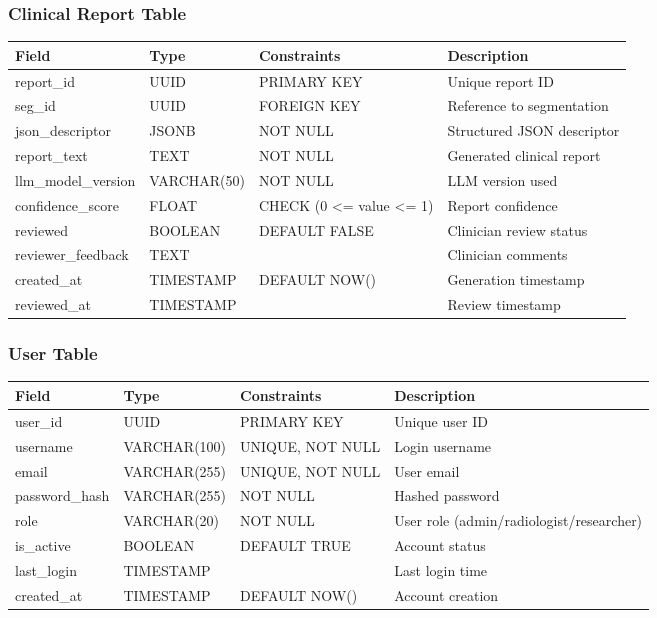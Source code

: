 \documentclass[12pt,a4paper]{article}
\begin{document}
\subsubsection{Clinical Report Table}
\begin{table}[H]
\centering
\begin{tabularx}{\textwidth}{|l|l|l|X|}
\hline
\textbf{Field} & \textbf{Type} & \textbf{Constraints} & \textbf{Description} \\
\hline
report\_id & UUID & PRIMARY KEY & Unique report ID \\
seg\_id & UUID & FOREIGN KEY & Reference to segmentation \\
json\_descriptor & JSONB & NOT NULL & Structured JSON descriptor \\
report\_text & TEXT & NOT NULL & Generated clinical report \\
llm\_model\_version & VARCHAR(50) & NOT NULL & LLM version used \\
confidence\_score & FLOAT & CHECK (0 <= value <= 1) & Report confidence \\
reviewed & BOOLEAN & DEFAULT FALSE & Clinician review status \\
reviewer\_feedback & TEXT & & Clinician comments \\
created\_at & TIMESTAMP & DEFAULT NOW() & Generation timestamp \\
reviewed\_at & TIMESTAMP & & Review timestamp \\
\hline
\end{tabularx}
\end{table}

\subsubsection{User Table}
\begin{table}[H]
\centering
\begin{tabularx}{\textwidth}{|l|l|l|X|}
\hline
\textbf{Field} & \textbf{Type} & \textbf{Constraints} & \textbf{Description} \\
\hline
user\_id & UUID & PRIMARY KEY & Unique user ID \\
username & VARCHAR(100) & UNIQUE, NOT NULL & Login username \\
email & VARCHAR(255) & UNIQUE, NOT NULL & User email \\
password\_hash & VARCHAR(255) & NOT NULL & Hashed password \\
role & VARCHAR(20) & NOT NULL & User role (admin/radiologist/researcher) \\
is\_active & BOOLEAN & DEFAULT TRUE & Account status \\
last\_login & TIMESTAMP & & Last login time \\
created\_at & TIMESTAMP & DEFAULT NOW() & Account creation \\
\hline
\end{tabularx}
\end{table}
\end{document}
